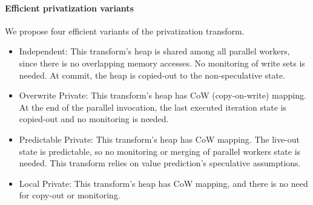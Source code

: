 \paragraph{Efficient privatization variants}
\label{novel_transf}
We propose four efficient variants of the privatization transform.
\begin{itemize}
%
\item Independent: This transform's heap is shared
  among all parallel workers, since there is no overlapping memory
  accesses.
  No monitoring of write sets is needed. At commit, the heap is copied-out
  to the non-speculative state.
%


\item Overwrite Private: This transform's heap has
  CoW (copy-on-write) mapping. At the end of the parallel
  invocation, the last executed iteration
  state is copied-out and no monitoring is needed.

%

\item Predictable Private: This transform's heap
  has CoW mapping. The live-out state is predictable, so no monitoring
  or merging of parallel workers state is needed. This transform
  relies on value prediction's speculative assumptions.

\item Local Private: This transform's heap has
  CoW mapping, and there is no need for copy-out or monitoring.

\end{itemize}

%

